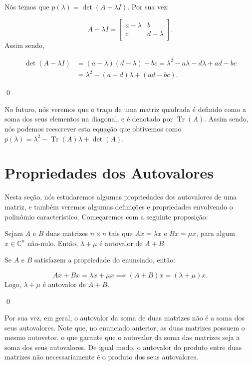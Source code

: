 \begin{Proof}
	Nós temos que $p(\lambda) = \det(A - \lambda I)$. Por sua vez:
	
	$$
	A - \lambda I = \begin{bmatrix}
		a - \lambda & b \\
		c & d - \lambda
	\end{bmatrix}.
	$$
	Assim sendo, 
	
	\begin{align*}
		\det(A - \lambda I) &= (a - \lambda)(d - \lambda) - bc = \lambda^2 - a\lambda - d\lambda + ad - bc \\ &= \lambda^2 - (a + d)\lambda + (ad - bc).
	\end{align*}
	
	\qed
\end{Proof}

No futuro, nós veremos que o traço de uma matriz quadrada é definido como a soma dos seus elementos na diagonal, e é denotado por $\operatorname{Tr}(A)$. Assim sendo, nós podemos reescrever esta equação que obtivemos como $p(\lambda) = \lambda^2 - \operatorname{Tr}(A)\lambda + \det(A)$.

\section{Propriedades dos Autovalores}

Nesta seção, nós estudaremos algumas propriedades dos autovalores de uma matriz, e também veremos algumas definições e propriedades envolvendo o polinômio característico. Começaremos com a seguinte proposição:

\begin{Proposition}
	Sejam $A$ e $B$ duas matrizes $n\times n$ tais que $Ax = \lambda x$ e $Bx = \mu x$, para algum $x\in\mathbb{C}^n$ não-nulo. Então, $\lambda + \mu$ é autovalor de $A + B$. 
\end{Proposition}

\begin{Proof}
	Se $A$ e $B$ satisfazem a propriedade do enunciado, então: 
	
	$$
	Ax + Bx = \lambda x + \mu x \implies (A + B)x = (\lambda + \mu)x.
	$$
	Logo, $\lambda + \mu$ é autovalor de $A + B$.
	
	\qed
\end{Proof}

Por sua vez, em geral, o autovalor da soma de duas matrizes não é a soma dos seus autovalores. Note que, no enunciado anterior, as duas matrizes possuem o mesmo autovetor, o que garante que o autovalor da soma das matrizes seja a soma dos seus autovalores. De igual modo, o autovalor do produto entre duas matrizes não necessariamente é o produto dos seus autovalores.

